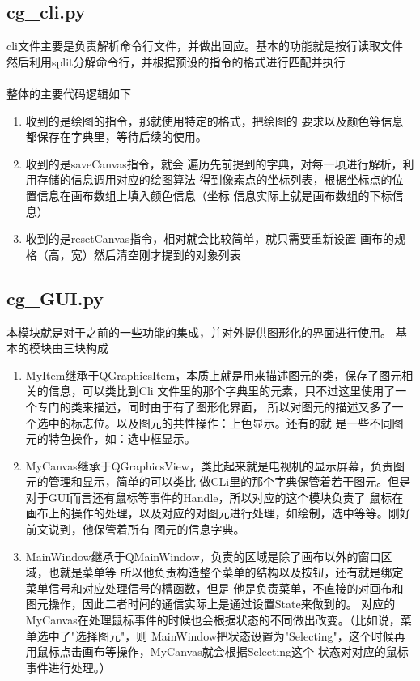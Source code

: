 \documentclass[a4paper,UTF8]{article}
\theoremstyle{definition}
\begin{document}
\subsection{cg\_cli.py}
cli文件主要是负责解析命令行文件，并做出回应。基本的功能就是按行读取文件
然后利用split分解命令行，并根据预设的指令的格式进行匹配并执行\\\\
整体的主要代码逻辑如下
\begin{enumerate}
    \item 收到的是绘图的指令，那就使用特定的格式，把绘图的
    要求以及颜色等信息都保存在字典里，等待后续的使用。
    \item 收到的是saveCanvas指令，就会
    遍历先前提到的字典，对每一项进行解析，利用存储的信息调用对应的绘图算法
    得到像素点的坐标列表，根据坐标点的位置信息在画布数组上填入颜色信息（坐标
    信息实际上就是画布数组的下标信息）
    \item 收到的是resetCanvas指令，相对就会比较简单，就只需要重新设置
    画布的规格（高，宽）然后清空刚才提到的对象列表
\end{enumerate}
\subsection{cg\_GUI.py}
本模块就是对于之前的一些功能的集成，并对外提供图形化的界面进行使用。
基本的模块由三块构成
\begin{enumerate}
    \item MyItem继承于QGraphicsItem，本质上就是用来描述图元的类，保存了图元相关的信息，可以类比到Cli
    文件里的那个字典里的元素，只不过这里使用了一个专门的类来描述，同时由于有了图形化界面，
    所以对图元的描述又多了一个选中的标志位。以及图元的共性操作：上色显示。还有的就
    是一些不同图元的特色操作，如：选中框显示。
    \item MyCanvas继承于QGraphicsView，类比起来就是电视机的显示屏幕，负责图元的管理和显示，简单的可以类比
    做CLi里的那个字典保管着若干图元。但是对于GUI而言还有鼠标等事件的Handle，所以对应的这个模块负责了
    鼠标在画布上的操作的处理，以及对应的对图元进行处理，如绘制，选中等等。刚好前文说到，他保管着所有
    图元的信息字典。
    \item MainWindow继承于QMainWindow，负责的区域是除了画布以外的窗口区域，也就是菜单等
    所以他负责构造整个菜单的结构以及按钮，还有就是绑定菜单信号和对应处理信号的槽函数，但是
    他是负责菜单，不直接的对画布和图元操作，因此二者时间的通信实际上是通过设置State来做到的。
    对应的MyCanvas在处理鼠标事件的时候也会根据状态的不同做出改变。（比如说，菜单选中了"选择图元"，则
    MainWindow把状态设置为"Selecting"，这个时候再用鼠标点击画布等操作，MyCanvas就会根据Selecting这个
    状态对对应的鼠标事件进行处理。）
\end{enumerate}
\end{document}
